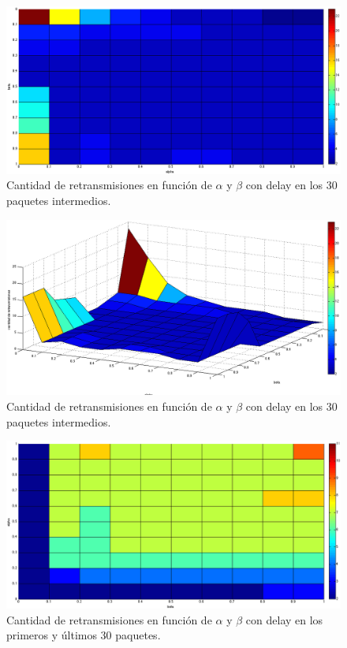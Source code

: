 \documentclass[10pt, a4paper]{article}
\begin{document}
\begin{figure}[H]
\begin{center}
\includegraphics[width=17cm]{delay-30F30L-ret.png}
\caption{Cantidad de retransmisiones en función de $\alpha$ y $\beta$ con delay en los 30 paquetes intermedios.}
\end{center}
\end{figure}

\begin{figure}[H]
\begin{center}
\includegraphics[width=17cm]{delay-30F30L-ret-costado.png}
\caption{Cantidad de retransmisiones en función de $\alpha$ y $\beta$ con delay en los 30 paquetes intermedios.}
\end{center}
\end{figure}


\begin{figure}[H]
\begin{center}
\includegraphics[width=17cm]{delay-30I-ret-costado.png}
\caption{Cantidad de retransmisiones en función de $\alpha$ y $\beta$ con delay en los primeros y últimos 30 paquetes.}
\end{center}
\end{figure}
\end{document}
